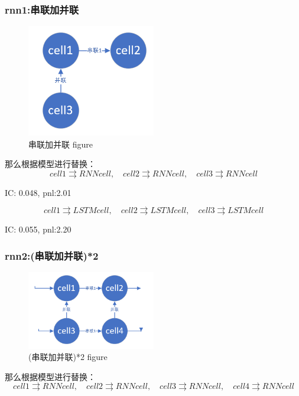 \documentclass[11pt]{ctexart}
\begin{document}
\subsubsection{rnn1:串联加并联}
\begin{figure}[H]
\begin{center}
\includegraphics[width=0.5\textwidth]{rnn1.PNG}
\end{center}
\caption{串联加并联 figure}
\label{FIG.19}
\end{figure}
那么根据模型进行替换：
$$cell1 \rightrightarrows RNNcell, \quad cell2 \rightrightarrows RNNcell, \quad cell3 \rightrightarrows RNNcell$$

{\kaishu \small IC: 0.048, pnl:2.01}

$$cell1 \rightrightarrows LSTMcell, \quad cell2 \rightrightarrows LSTMcell, \quad cell3 \rightrightarrows LSTMcell$$

{\kaishu \small IC: 0.055, pnl:2.20}

\subsubsection{rnn2:(串联加并联)*2}
\begin{figure}[H]
\begin{center}
\includegraphics[width=0.5\textwidth]{rnn2.PNG}
\end{center}
\caption{(串联加并联)*2 figure}
\label{FIG.20}
\end{figure}
那么根据模型进行替换：
$$cell1 \rightrightarrows RNNcell, \quad cell2 \rightrightarrows RNNcell, \quad cell3 \rightrightarrows RNNcell, \quad cell4 \rightrightarrows RNNcell$$
\end{document}
